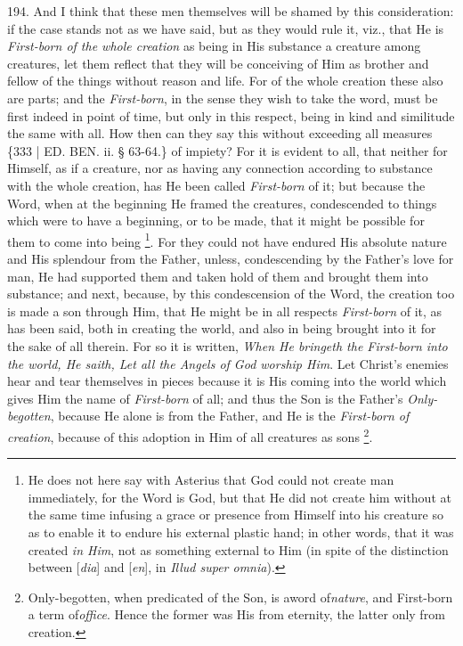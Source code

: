 194. And I think that these
men themselves will be shamed by this consideration: if the case
stands not as we have said, but as they would rule it, viz., that He
is \emph{First-born of the whole creation} as being in His substance a
creature among creatures, let them reflect that they will be
conceiving of Him as brother and fellow of the things without reason
and life. For of the whole creation these also are parts; and the \emph{First-born},
in the sense they wish to take the word, must be first indeed in point
of time, but only in this respect, being in kind and similitude the
same with all. How then can they say this without exceeding all
measures \{333 | ED.
BEN. ii. § 63-64.\} of impiety? For it is
evident to all, that neither for Himself, as if a creature, nor as
having any connection according to substance with the whole creation,
has He been called \emph{First-born} of it; but because the Word, when
at the beginning He framed the creatures, condescended to things which
were to have a beginning, or to be made, that it might be possible for
them to come into being \footnote{He does not here say with Asterius that God could not create man
immediately, for the Word is God, but that He did not create him
without at the same time infusing a grace or presence from Himself
into his creature so as to enable it to endure his external plastic
hand; in other words, that it was created \emph{in Him}, not as
something external to Him (in spite of the distinction between [\emph{dia}]
and [\emph{en}], in \emph{Illud super omnia}).}.
For they could not have endured His absolute nature and His splendour
from the Father, unless, condescending by the Father's love for man,
He had supported them and taken hold of them and brought them into
substance; and next, because, by this condescension of the Word, the
creation too is made a son through Him, that He might be in all
respects \emph{First-born} of it, as has been said, both in creating
the world, and also in being brought into it for the sake of all
therein. For so it is written, \emph{When He bringeth the First-born into
the world, He saith, Let all the Angels of God worship Him}. Let
Christ's enemies hear and tear themselves in pieces because it is His
coming into the world which gives Him the name of \emph{First-born} of
all; and thus the Son is the Father's \emph{Only-begotten}, because He
alone is from the Father, and He is the \emph{First-born of creation},
because of this adoption in Him of all creatures as sons \footnote{Only-begotten, when predicated of the Son, is a\emph{}word of\emph{nature}, and First-born a term of\emph{office}. Hence the former
was His from eternity, the latter only from creation.}.

